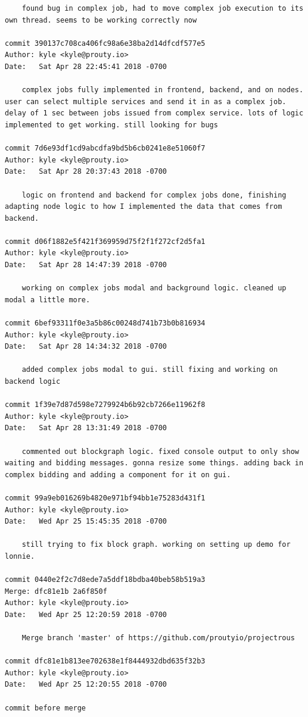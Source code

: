 \documentclass[draftclsnofoot, onecolumn, compsoc, 10pt]{IEEEtran}
\begin{document}
\begin{lstlisting}
    found bug in complex job, had to move complex job execution to its own thread. seems to be working correctly now 

commit 390137c708ca406fc98a6e38ba2d14dfcdf577e5 
Author: kyle <kyle@prouty.io> 
Date:   Sat Apr 28 22:45:41 2018 -0700 

    complex jobs fully implemented in frontend, backend, and on nodes. user can select multiple services and send it in as a complex job. delay of 1 sec between jobs issued from complex service. lots of logic implemented to get working. still looking for bugs 

commit 7d6e93df1cd9abcdfa9bd5b6cb0241e8e51060f7 
Author: kyle <kyle@prouty.io> 
Date:   Sat Apr 28 20:37:43 2018 -0700 

    logic on frontend and backend for complex jobs done, finishing adapting node logic to how I implemented the data that comes from backend. 

commit d06f1882e5f421f369959d75f2f1f272cf2d5fa1 
Author: kyle <kyle@prouty.io> 
Date:   Sat Apr 28 14:47:39 2018 -0700 

    working on complex jobs modal and background logic. cleaned up modal a little more. 

commit 6bef93311f0e3a5b86c00248d741b73b0b816934 
Author: kyle <kyle@prouty.io> 
Date:   Sat Apr 28 14:34:32 2018 -0700 

    added complex jobs modal to gui. still fixing and working on backend logic 

commit 1f39e7d87d598e7279924b6b92cb7266e11962f8 
Author: kyle <kyle@prouty.io> 
Date:   Sat Apr 28 13:31:49 2018 -0700 

    commented out blockgraph logic. fixed console output to only show waiting and bidding messages. gonna resize some things. adding back in complex bidding and adding a component for it on gui. 

commit 99a9eb016269b4820e971bf94bb1e75283d431f1 
Author: kyle <kyle@prouty.io> 
Date:   Wed Apr 25 15:45:35 2018 -0700 

    still trying to fix block graph. working on setting up demo for lonnie. 

commit 0440e2f2c7d8ede7a5ddf18bdba40beb58b519a3 
Merge: dfc81e1b 2a6f850f 
Author: kyle <kyle@prouty.io> 
Date:   Wed Apr 25 12:20:59 2018 -0700 

    Merge branch 'master' of https://github.com/proutyio/projectrous 

commit dfc81e1b813ee702638e1f8444932dbd635f32b3 
Author: kyle <kyle@prouty.io> 
Date:   Wed Apr 25 12:20:55 2018 -0700 

commit before merge 
\end{lstlisting}
\end{document}
